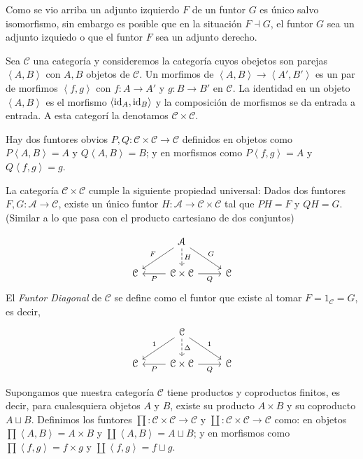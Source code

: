 \documentclass{comunicaciones}
\begin{document}
Como se vio arriba un adjunto izquierdo $F$ de un funtor $G$ es \'unico salvo isomorfismo, sin embargo es posible que en la situaci\'on $F\dashv G$, el funtor $G$ sea un adjunto izquiedo o que el funtor $F$ sea un adjunto derecho.

\begin{ej}
	Sea $\mathcal{C}$ una categor\'ia y consideremos la categor\'ia cuyos obejetos son parejas $\left\langle A, B\right\rangle$ con $A,B$ objetos de $\mathcal{C}$. Un morfimos de $\left\langle A,B\right\rangle\to \left\langle A', B' \right\rangle$ es un par de morfimos $\left\langle f, g \right\rangle$ con $f:A\to A'$ y $g:B\to B'$ en $\mathcal{C}$. La identidad en un objeto $\left\langle A,B\right\rangle $ es el morfismo $\left\langle \mathrm{id}_A, \mathrm{id}_B\right\rangle$ y la composici\'on de morfismos se da entrada a entrada. A esta categor\'i la denotamos $\mathcal{C}\times \mathcal{C}$. 
	
	Hay dos funtores obvios $P,Q:\mathcal{C}\times\mathcal{C}\to \mathcal{C}$ definidos en objetos como $P\left\langle A, B\right\rangle=A$ y $Q\left\langle A, B\right\rangle= B$; y en morfismos como $P\left\langle f, g\right\rangle=A$ y $Q\left\langle f, g\right\rangle= g$.
	
	La categor\'ia $\mathcal{C}\times\mathcal{C}$ cumple la siguiente propiedad universal: Dados dos funtores $F,G:\mathcal{A}\to \mathcal{C}$, existe un \'unico funtor $H:\mathcal{A}\to \mathcal{C}\times\mathcal{C}$ tal que $PH=F$ y $QH=G$. (Similar a lo que pasa con el producto cartesiano de dos conjuntos)
	
	\[
	\begin{tikzcd}
		& \mathcal{A} \arrow[dl, "F"'] \arrow[dr, "G"] \arrow[d, dashed, "H"] & \\
		\mathcal{C} & \mathcal{C}\times\mathcal{C} \arrow[l,"P"] \arrow[r, "Q"'] & \mathcal{C}
	\end{tikzcd}
	\]
	El \textit{Funtor Diagonal} de $\mathcal{C}$ se define como el funtor que existe al tomar $F=1_{\mathcal{C}}=G$, es decir,
	\[
	\begin{tikzcd}
		& \mathcal{C} \arrow[dl, "1"'] \arrow[dr, "1"] \arrow[d, dashed, "\Delta"] & \\
		\mathcal{C} & \mathcal{C}\times\mathcal{C} \arrow[l,"P"] \arrow[r, "Q"'] & \mathcal{C}
	\end{tikzcd}
	\]
	
	Supongamos que nuestra categor\'ia $\mathcal{C}$ tiene productos y coproductos finitos, es decir, para cualesquiera objetos $A$ y $B$, existe su producto $A\times B$ y su coproducto $A\sqcup B$. Definimos los funtores $\prod:\mathcal{C}\times\mathcal{C}\to \mathcal{C}$ y $\coprod:\mathcal{C}\times\mathcal{C}\to \mathcal{C}$ como: en objetos $\prod\left\langle A, B\right\rangle=A\times B$ y $\coprod\left\langle A, B\right\rangle=A\sqcup B$; y en morfismos como $\prod\left\langle f, g\right\rangle=f\times g$ y $\coprod\left\langle f, g\right\rangle=f\sqcup g$. 
	

\end{ej}
\end{document}
